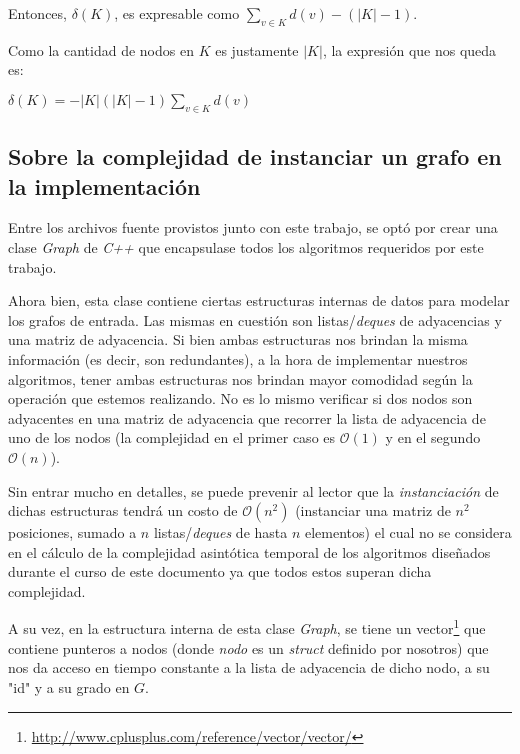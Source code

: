 \bigskip
\par Entonces, $\delta(K)$, es expresable como $\displaystyle\sum_{v \in K}d(v) - (|K|-1)$.
\bigskip

\par Como la cantidad de nodos en $K$ es justamente $|K|$, la expresi\'on
    que nos queda es:

\bigskip
\par $\delta(K) = -|K|(|K|-1)\displaystyle\sum_{v \in K}d(v)$
\bigskip

{}
\subsection*{Sobre la complejidad de instanciar un grafo en la implementaci\'on}\label{grafo:estructuras}
\par Entre los archivos fuente provistos junto con este trabajo, se opt\'o por
    crear una clase \emph{Graph} de \emph{C++} que encapsulase todos los algoritmos
    requeridos por este trabajo.

\par Ahora bien, esta clase contiene ciertas estructuras internas de datos
    para modelar los grafos de entrada. Las mismas en cuesti\'on son listas/\emph{deques}
    de adyacencias y una matriz de adyacencia. Si bien ambas estructuras nos
    brindan la misma informaci\'on (es decir, son redundantes), a la hora
    de implementar nuestros algoritmos, tener ambas estructuras nos brindan
    mayor comodidad seg\'un la operaci\'on que estemos realizando. No es lo
    mismo verificar si dos nodos son adyacentes en una matriz de adyacencia que
    recorrer la lista de adyacencia de uno de los nodos (la complejidad en
    el primer caso es $\mathcal O(1)$ y en el segundo $\mathcal O(n)$).

\par Sin entrar mucho en detalles, se puede prevenir al lector que la \emph{%
    instanciaci\'on} de dichas estructuras tendr\'a un costo de $\mathcal O%
    (n^2)$ (instanciar una matriz de $n^2$ posiciones, sumado a $n$ listas/\emph{deques} de
    hasta $n$ elementos) el cual no se considera en el c\'alculo de la complejidad
    asint\'otica temporal de los algoritmos dise\~nados durante el curso de este
    documento ya que todos estos superan dicha complejidad.

\par A su vez, en la estructura interna de esta clase \emph{Graph}, se tiene
    un vector\footnote{\url{http://www.cplusplus.com/reference/vector/vector/}}
    que contiene punteros a nodos (donde \emph{nodo} es un \emph{struct} definido
    por nosotros) que nos da acceso en tiempo constante a la lista de adyacencia
    de dicho nodo, a su "id" y a su grado en $G$.

